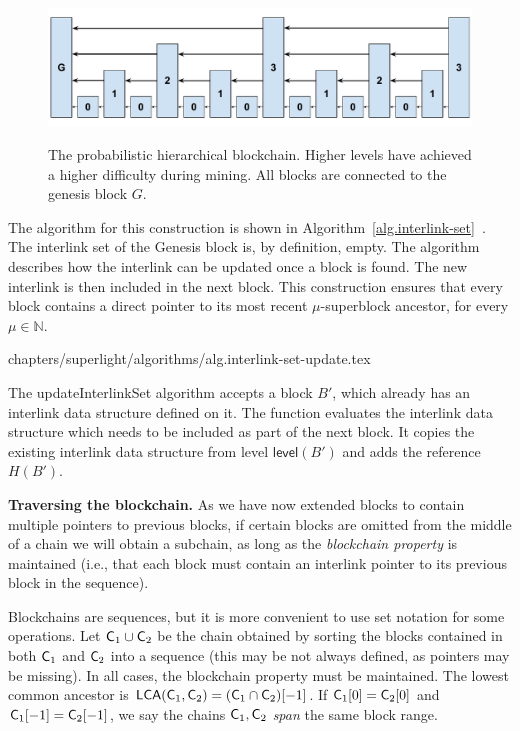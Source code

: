 \begin{figure}
    \caption{The probabilistic hierarchical blockchain.
    Higher levels have achieved a higher difficulty during
    mining. All blocks are connected to the genesis block $G$.}
    \centering
    \includegraphics[width=0.7\columnwidth,keepaspectratio]{chapters/superlight/figures/hierarchical-ledger-span.pdf}
    \label{fig.hierarchy}
\end{figure}

The algorithm for this construction is shown in
Algorithm~\ref{alg.interlink-set}~\cite{compactsuperblocks}. The
interlink set of the Genesis block is, by definition, empty. The algorithm
describes how the interlink can be updated once a block is found. The new
interlink is then included in the next block. This construction ensures that
every block contains a direct pointer to its most recent $\mu$-superblock
ancestor, for every $\mu \in \mathbb{N}$.

{chapters/superlight/algorithms/alg.interlink-set-update.tex}

The \textsf{updateInterlinkSet} algorithm accepts a block $B'$, which already has an
interlink data structure defined on it. The function evaluates the
interlink data structure which needs to be included as part of the next block.
It copies the existing interlink data structure from level $\textsf{level}(B')$
and adds the reference $H(B')$.

\noindent\textbf{Traversing the blockchain. }
As we have now extended blocks to contain multiple pointers to previous blocks,
if certain blocks are omitted from the middle of a chain we will obtain a
subchain, as long as the \emph{blockchain property} is maintained (i.e., that
each block must contain an interlink pointer to its previous block in the
sequence).

Blockchains are sequences, but it is more convenient to use set notation for
some operations. Let $\mathsf{C}_1 \cup \mathsf{C}_2$ be the chain obtained by sorting
the blocks contained in both $\mathsf{C}_1$ and $\mathsf{C}_2$ into a sequence (this may
be not always defined, as pointers may be missing). In all cases, the blockchain
property must be maintained. The lowest common ancestor is
$\textsf{LCA}(\mathsf{C}_1, \mathsf{C}_2) = (\mathsf{C}_1 \cap \mathsf{C}_2)[-1]$. If
$\mathsf{C}_1[0] = \mathsf{C}_2[0]$ and $\mathsf{C}_1[-1] = \mathsf{C}_2[-1]$, we say the chains
$\mathsf{C}_1, \mathsf{C}_2$ \emph{span} the same block range.

